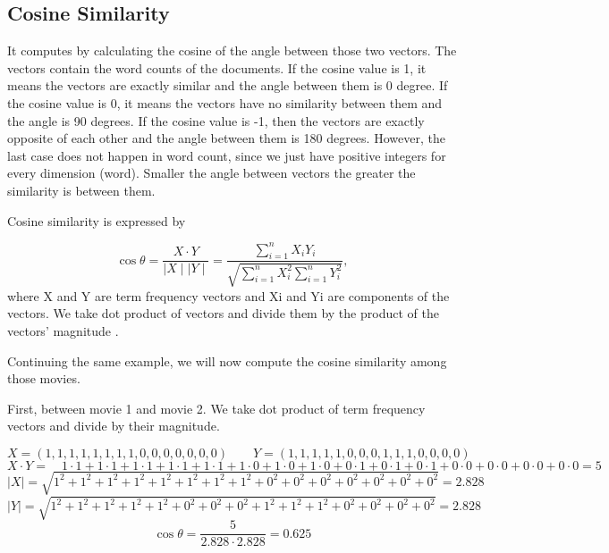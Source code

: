 \subsection{Cosine Similarity}

It computes by calculating the cosine of the angle between those two vectors. The vectors contain the word counts of the documents. If the cosine value is 1, it means the vectors are exactly similar and the angle between them is 0 degree. If the cosine value is 0, it means the vectors have no similarity between them and the angle is 90 degrees. If the cosine value is -1, then the vectors are exactly opposite of each other and the angle between them is 180 degrees. However, the last case does not happen in word count, since we just have positive integers for every dimension (word).  Smaller the angle between vectors the greater the similarity is between them.

Cosine similarity is expressed by

\begin{equation}
\cos \theta = \frac{X \cdot Y}{\mid X \mid \mid Y \mid} 
           = \frac{\sum_{i = 1}^{n}X_i Y_i}{\sqrt{\sum_{i = 1}^{n}X_i^2 \sum_{i = 1}^{n}Y_i^2}},
\end{equation}
where X and Y are term frequency vectors and Xi and Yi are components of the vectors. We take dot product of vectors and divide them by the product of the vectors' magnitude \cite{Han2017}.

Continuing the same example, we will now compute the cosine similarity among those movies.

First, between movie 1 and movie 2. We take dot product of term frequency vectors and divide by their magnitude.

\begin{equation*}
X = (1,1,1,1,1,1,1,1,0,0,0,0,0,0,0) \qquad Y = (1,1,1,1,1,0,0,0,1,1,1,0,0,0,0)
\end{equation*}
\begin{equation*}
X \cdot Y = \quad 1 \cdot 1 + 1 \cdot 1 + 1 \cdot 1 + 1 \cdot 1 + 1 \cdot 1 + 1 \cdot 0 + 1 \cdot 0 + 1 \cdot 0 + 0 \cdot 1 + 0 \cdot 1 + 0 \cdot 1 + 0 \cdot 0 + 0 \cdot 0 + 0 \cdot 0 + 0 \cdot 0 = 5
\end{equation*}
\begin{equation*}
\mid X \mid = \sqrt{1^2 + 1^2 + 1^2 + 1^2 + 1^2 + 1^2 + 1^2 + 1^2 + 0^2 + 0^2 + 0^2 + 0^2 + 0^2 + 0^2 + 0^2} = 2.828
\end{equation*}
\begin{equation*}
\mid Y \mid = \sqrt{1^2 + 1^2 + 1^2 + 1^2 + 1^2 + 0^2 + 0^2 + 0^2 + 1^2 + 1^2 + 1^2 + 0^2 + 0^2 + 0^2 + 0^2} = 2.828
\end{equation*}
\begin{equation}
\cos \theta = \frac{5}{2.828 \cdot 2.828} = 0.625
\end{equation}


